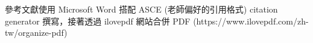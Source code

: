 參考文獻使用 Microsoft Word 搭配 ASCE (老師偏好的引用格式) citation generator 撰寫，接著透過 ilovepdf 網站合併 PDF (https://www.ilovepdf.com/zh-tw/organize-pdf)